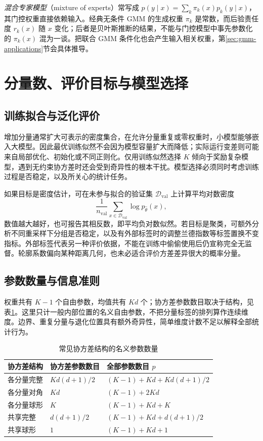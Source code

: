 \documentclass[UTF8,12pt,a4paper,fontset=fandol]{ctexart}
\begin{document}
\emph{混合专家模型}（mixture of experts）常写成 $p(y\mid x)=\sum_k\pi_k(x)p_k(y\mid x)$，其门控权重直接依赖输入。经典无条件 GMM 的生成权重 $\pi_k$ 是常数，而后验责任度 $r_k(x)$ 随 $x$ 变化；后者是贝叶斯推断的结果，不能与门控模型中事先参数化的 $\pi_k(x)$ 混为一谈。把联合 GMM 条件化也会产生输入相关权重，第\ref{sec:gmm-applications}节会具体推导。

\section{分量数、评价目标与模型选择}
\label{sec:gmm-model-selection}

\subsection{训练拟合与泛化评价}
增加分量通常扩大可表示的密度集合，在允许分量重复或零权重时，小模型能够嵌入大模型。因此最优训练似然不会因为模型容量扩大而降低；实际运行变差则可能来自局部优化、初始化或不同正则化。仅用训练似然选择 $K$ 倾向于奖励复杂模型，遇到无约束协方差时还会受到奇异性的根本干扰。模型选择必须同时考虑训练过程是否稳定，以及所关心的统计任务。

如果目标是密度估计，可在未参与拟合的验证集 $\mathcal D_{\mathrm{val}}$ 上计算平均对数密度
\[
\frac1{n_{\mathrm{val}}}\sum_{x\in\mathcal D_{\mathrm{val}}}\log p_{\widehat\theta}(x),
\]
数值越大越好，也可报告其相反数，即平均负对数似然。若目标是聚类，可额外分析不同重采样下分组是否稳定，以及有外部标签时的调整兰德指数等标签置换不变指标。外部标签代表另一种评价依据，不能在训练中偷偷使用后仍宣称完全无监督。轮廓系数偏向某种距离几何，也未必适合评价方差差异很大的概率分量。

\subsection{参数数量与信息准则}
权重共有 $K-1$ 个自由参数，均值共有 $Kd$ 个；协方差参数数目取决于结构，见表\ref{tab:gmm-parameter-count}。这里只计一般内部位置的名义自由参数，不把分量标签的排列算作连续维度。边界、重复分量与退化位置具有额外奇异性，简单维度计数不足以解释全部统计行为。
\begin{table}[htbp]
\centering
\caption{常见协方差结构的名义参数数量}
\label{tab:gmm-parameter-count}
\begin{tabular}{lll}
\toprule
协方差结构 & 协方差参数数目 & 全部参数数目 $p$\\
\midrule
各分量完整 & $Kd(d+1)/2$ & $(K-1)+Kd+Kd(d+1)/2$\\
各分量对角 & $Kd$ & $(K-1)+2Kd$\\
各分量球形 & $K$ & $(K-1)+Kd+K$\\
共享完整 & $d(d+1)/2$ & $(K-1)+Kd+d(d+1)/2$\\
共享球形 & $1$ & $(K-1)+Kd+1$\\
\bottomrule
\end{tabular}
\end{table}
\end{document}
